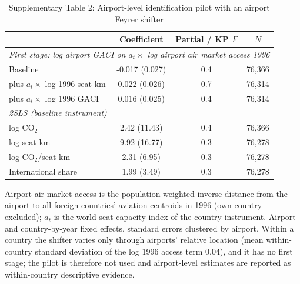 \documentclass[12pt]{article}
\begin{document}
\begin{table}[htbp]
\centering
\begin{threeparttable}
\caption{Supplementary Table 2: Airport-level identification pilot with an airport Feyrer shifter}
\label{tab:airport_iv}
\scriptsize
\begin{tabular}{lccc}
\toprule
 & Coefficient & Partial / KP $F$ & $N$ \\
\midrule
\multicolumn{4}{l}{\textit{First stage: log airport GACI on $a_t \times$ log airport air market access 1996}} \\
  Baseline & -0.017 (0.027) & 0.4 & 76,366 \\
  \quad plus $a_t \times$ log 1996 seat-km & 0.022 (0.026) & 0.7 & 76,314 \\
  \quad plus $a_t \times$ log 1996 GACI & 0.016 (0.025) & 0.4 & 76,314 \\
\midrule
\multicolumn{4}{l}{\textit{2SLS (baseline instrument)}} \\
  log CO$_2$ & 2.42 (11.43) & 0.4 & 76,366 \\
  log seat-km & 9.92 (16.77) & 0.3 & 76,278 \\
  log CO$_2$/seat-km & 2.31 (6.95) & 0.3 & 76,278 \\
  International share & 1.99 (3.49) & 0.3 & 76,278 \\
\bottomrule
\end{tabular}
\begin{tablenotes}\scriptsize
\item Airport air market access is the population-weighted inverse distance from the airport to all foreign countries' aviation centroids in 1996 (own country excluded); $a_t$ is the world seat-capacity index of the country instrument. Airport and country-by-year fixed effects, standard errors clustered by airport. Within a country the shifter varies only through airports' relative location (mean within-country standard deviation of the log 1996 access term 0.04), and it has no first stage; the pilot is therefore not used and airport-level estimates are reported as within-country descriptive evidence.
\end{tablenotes}
\end{threeparttable}
\end{table}
\end{document}

